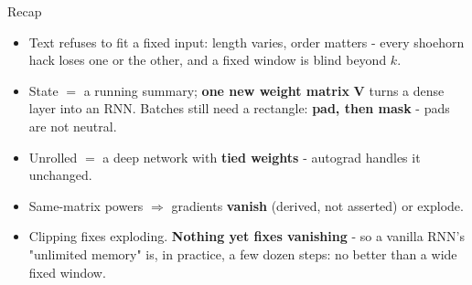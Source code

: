 \documentclass[aspectratio=169]{beamer}
\begin{document}
\begin{frame}{Recap}
  \begin{itemize}
    \item Text refuses to fit a fixed input: length varies, order matters - every
      shoehorn hack loses one or the other, and a fixed window is blind beyond $k$.
    \item State $=$ a running summary; \textbf{one new weight matrix} $\mathbf{V}$ turns
      a dense layer into an RNN. Batches still need a rectangle: \textbf{pad, then mask}
      - pads are not neutral.
    \item Unrolled $=$ a deep network with \textbf{tied weights} - autograd handles it
      unchanged.
    \item Same-matrix powers $\Rightarrow$ gradients \textbf{vanish} (derived, not
      asserted) or explode.
    \item Clipping fixes exploding. \textbf{Nothing yet fixes vanishing} - so a vanilla
      RNN's "unlimited memory" is, in practice, a few dozen steps: no better than a wide
      fixed window.
  \end{itemize}
  \vskip 6pt
\end{frame}
\end{document}
